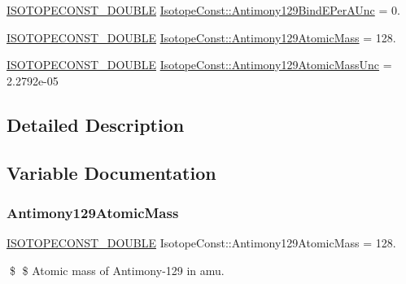 \begin{DoxyCompactItemize}
\mbox{\hyperlink{group___isotope_const-_macros_ga8f45a7272ce02c0b4c65c44636ed719a}{I\+S\+O\+T\+O\+P\+E\+C\+O\+N\+S\+T\+\_\+\+D\+O\+U\+B\+LE}} \mbox{\hyperlink{group___isotope_const-_antimony-_sb129_gac0642f66e2d93c1e368a476696715cf5}{Isotope\+Const\+::\+Antimony129\+Bind\+E\+Per\+A\+Unc}} = 0.
\item 
\mbox{\hyperlink{group___isotope_const-_macros_ga8f45a7272ce02c0b4c65c44636ed719a}{I\+S\+O\+T\+O\+P\+E\+C\+O\+N\+S\+T\+\_\+\+D\+O\+U\+B\+LE}} \mbox{\hyperlink{group___isotope_const-_antimony-_sb129_ga3372e78a941688566e619a4db342c361}{Isotope\+Const\+::\+Antimony129\+Atomic\+Mass}} = 128.
\item 
\mbox{\hyperlink{group___isotope_const-_macros_ga8f45a7272ce02c0b4c65c44636ed719a}{I\+S\+O\+T\+O\+P\+E\+C\+O\+N\+S\+T\+\_\+\+D\+O\+U\+B\+LE}} \mbox{\hyperlink{group___isotope_const-_antimony-_sb129_ga93a047ac4653ee48505cc092a7a39f40}{Isotope\+Const\+::\+Antimony129\+Atomic\+Mass\+Unc}} = 2.\+2792e-\/05
\end{DoxyCompactItemize}


\subsection{Detailed Description}


\subsection{Variable Documentation}
\mbox{\label{group___isotope_const-_antimony-_sb129_ga3372e78a941688566e619a4db342c361}} 
\subsubsection{\texorpdfstring{Antimony129\+Atomic\+Mass}{Antimony129AtomicMass}}
{\footnotesize\ttfamily \mbox{\hyperlink{group___isotope_const-_macros_ga8f45a7272ce02c0b4c65c44636ed719a}{I\+S\+O\+T\+O\+P\+E\+C\+O\+N\+S\+T\+\_\+\+D\+O\+U\+B\+LE}} Isotope\+Const\+::\+Antimony129\+Atomic\+Mass = 128.}

\$ \$ Atomic mass of Antimony-\/129 in amu. \mbox{\label{group___isotope_const-_antimony-_sb129_ga93a047ac4653ee48505cc092a7a39f40}} 
